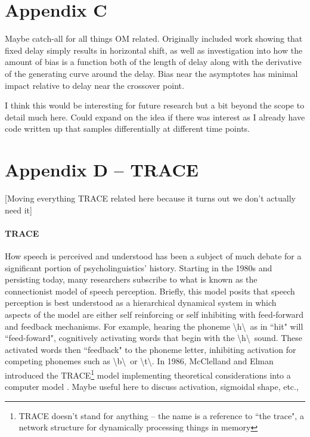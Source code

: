 \documentclass{article}
\begin{document}
\section*{Appendix C}

Maybe catch-all for all things OM related. Originally included work showing that fixed delay simply results in horizontal shift, as well as investigation into how the amount of bias is a function both of the length of delay along with the derivative of the generating curve around the delay. Bias near the asymptotes has minimal impact relative to delay near the crossover point.

I think this would be interesting for future research but a bit beyond the scope to detail much here. Could expand on the idea if there was interest as I already have code written up that samples differentially at different time points.

\section*{Appendix D -- TRACE}

[Moving everything TRACE related here because it turns out we don't actually need it]



\paragraph{TRACE } How speech is perceived and understood has been a subject of much debate for a significant portion of psycholinguistics' history. Starting in the 1980s and persisting today, many researchers subscribe to what is known as the connectionist model of speech perception. Briefly, this model posits that speech perception is best understood as a hierarchical dynamical system in which aspects of the model are either self reinforcing or self inhibiting with feed-forward and feedback mechanisms. For example, hearing the phoneme \textbackslash h\textbackslash  \ as in ``hit" will ``feed-foward", cognitively activating words that begin with the \textbackslash h\textbackslash \  sound. These activated words then ``feedback" to the phoneme letter, inhibiting activation for competing phonemes such as \textbackslash b\textbackslash \ or \textbackslash t\textbackslash. In 1986, McClelland and Elman introduced the TRACE\footnote{TRACE doesn't stand for anything -- the name is a reference to ``the trace", a network structure for dynamically processing things in memory} model implementing theoretical considerations into a computer model \cite{elman1985speech}. Maybe useful here to discuss activation, sigmoidal shape, etc., 
\end{document}
